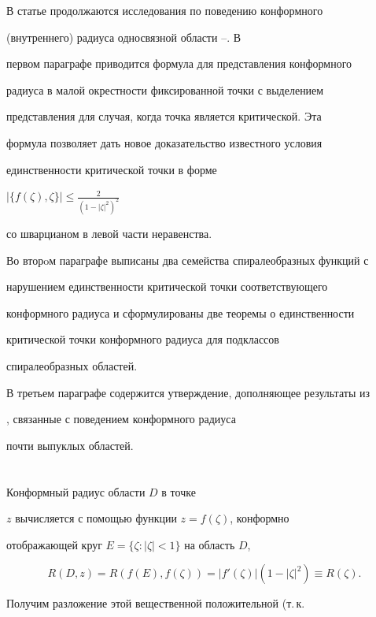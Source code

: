 В статье продолжаются исследования по поведению конформного


(внутреннего) радиуса односвязной области \cite{1}--\cite{4}. В


первом параграфе приводится формула для представления конформного


радиуса в малой окрестности фиксированной точки с выделением


представления для случая, когда точка является критической. Эта


формула позволяет дать новое доказательство известного условия


\cite{5} единственности критической точки в форме


$|\{f(\zeta),\zeta\}|\leq \frac{2}{(1-|\zeta|^2)^2}$


со шварцианом в левой части неравенства.


Во вторoм параграфе выписаны два семейства спиралеобразных функций с


нарушением единственности критической точки соответствующего


конформного радиуса и сформулированы две теоремы о единственности


критической точки конформного радиуса для подклассов


спиралеобразных областей.


В третьем параграфе содержится утверждение, дополняющее результаты из


\cite{4}, связанные с поведением конформного радиуса


почти выпуклых областей.





\section{}





Конформный радиус области $D$ в точке


$z$ вычисляется с помощью функции $z=f(\zeta)$, конформно


отображающей круг $E=\{\zeta:|\zeta|<1 \}$ на область $D$,


$$


R({D},z)=R(f(E),f(\zeta))=|f'(\zeta)|(1-|\zeta|^2)\equiv R(\zeta).


$$


Получим разложение этой вещественной положительной (т.\,к.


